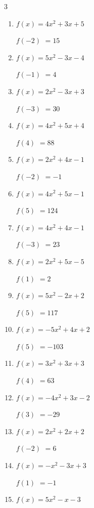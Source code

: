 \begin{multicols}{3}
\begin{enumerate}
$f(-2)$
        $= -3$

\columnbreak %

  \item $f(x)=4x^{2}+3x+5$

$f(-2)$
        $= 15$

  \item $f(x)=5x^{2}-3x-4$

$f(-1)$
        $= 4$

  \item $f(x)=2x^{2}-3x+3$

$f(-3)$
        $= 30$

  \item $f(x)=4x^{2}+5x+4$

$f(4)$
        $= 88$

  \item $f(x)=2x^{2}+4x-1$

$f(-2)$
        $= -1$

  \item $f(x)=4x^{2}+5x-1$

$f(5)$
        $= 124$

  \item $f(x)=4x^{2}+4x-1$

$f(-3)$
        $= 23$

  \item $f(x)=2x^{2}+5x-5$

$f(1)$
        $= 2$

  \item $f(x)=5x^{2}-2x+2$

$f(5)$
        $= 117$

  \item $f(x)=-5x^{2}+4x+2$

$f(5)$
        $= -103$

  \item $f(x)=3x^{2}+3x+3$

$f(4)$
        $= 63$

  \item $f(x)=-4x^{2}+3x-2$

$f(3)$
        $= -29$

  \item $f(x)=2x^{2}+2x+2$

$f(-2)$
        $= 6$

  \item $f(x)=-x^{2}-3x+3$

$f(1)$
        $= -1$

  \item $f(x)=5x^{2}-x-3$


\end{enumerate}
\end{multicols}
